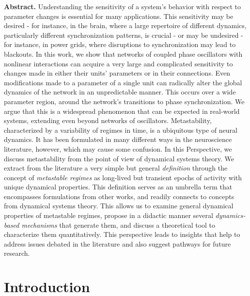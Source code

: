 \vspace{1.5em}
\noindent
\textbf{Abstract.} 
Understanding the sensitivity of a system's behavior with respect to parameter changes is essential for many applications. This sensitivity may be desired - for instance, in the brain, where a large repertoire of different dynamics, particularly different synchronization patterns, is crucial - or may be undesired - for instance, in power grids, where disruptions to synchronization may lead to blackouts. In this work, we show that networks of coupled phase oscillators with nonlinear interactions can acquire a very large and complicated sensitivity to changes made in either their units' parameters or in their connections. Even modifications made to a parameter of a single unit can radically alter the global dynamics of the network in an unpredictable manner. This occurs over a wide parameter region, around the network's transitions to phase synchronization. We argue that this is a widespread phenomenon that can be expected in real-world systems, extending even beyond networks of oscillators. 
Metastability, characterized by a variability of regimes in time, is a ubiquitous type of neural dynamics. It has been formulated in many different ways in the neuroscience literature, however, which may cause some confusion. In this Perspective, we discuss metastability from the point of view of dynamical systems theory. We extract from the literature a very simple but general \textit{definition} through the concept of \textit{metastable regimes} as long-lived but transient epochs of activity with unique dynamical properties. This definition serves as an umbrella term that encompasses formulations from other works, and readily connects to concepts from dynamical systems theory. This allows us to examine general dynamical properties of metastable regimes, propose in a didactic manner several \textit{dynamics-based mechanisms} that generate them, and discuss a theoretical tool to characterize them quantitatively. This perspective leads to insights that help to address issues debated in the literature and also suggest pathways for future research.
\vspace{1.5em}

\section{Introduction}

